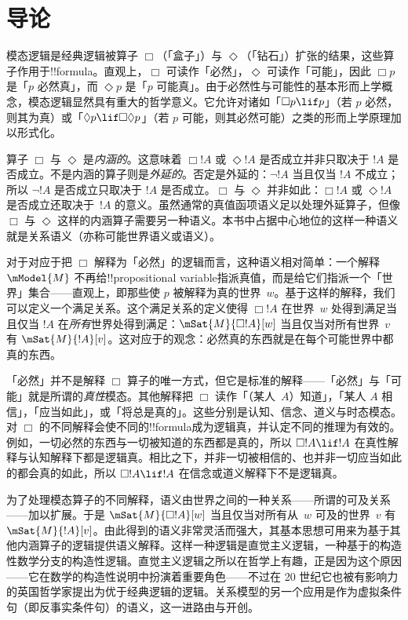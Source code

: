 
\ifdefined\ollangid
\chapter{导论}

模态逻辑是经典逻辑被算子 $\Box$（「盒子」）与 $\Diamond$（「钻石」）扩张的结果，这些算子作用于!!{formula}。直观上，$\Box$ 可读作「必然」，$\Diamond$ 可读作「可能」，因此 $\Box p$ 是「$p$ 必然真」，而 $\Diamond p$ 是「$p$ 可能真」。由于必然性与可能性的基本形而上学概念，模态逻辑显然具有重大的哲学意义。它允许对诸如「$\Box p \lif p$」（若 $p$ 必然，则其为真）或「$\Diamond p \lif \Box\Diamond p$」（若 $p$ 可能，则其必然可能）之类的形而上学原理加以形式化。

算子 $\Box$ 与 $\Diamond$ 是\emph{内涵的}。这意味着 $\Box !A$ 或 $\Diamond !A$ 是否成立并非只取决于 $!A$ 是否成立。不是内涵的算子则是\emph{外延的}。否定是外延的：$\lnot !A$ 当且仅当 $!A$ 不成立；所以 $\lnot !A$ 是否成立只取决于 $!A$ 是否成立。$\Box$ 与 $\Diamond$ 并非如此：$\Box !A$ 或 $\Diamond !A$ 是否成立还取决于~$!A$ 的意义。虽然通常的真值函项语义足以处理外延算子，但像 $\Box$ 与 $\Diamond$ 这样的内涵算子需要另一种语义。本书中占据中心地位的这样一种语义就是关系语义（亦称可能世界语义或语义）。

对于对应于把 $\Box$ 解释为「必然」的逻辑而言，这种语义相对简单：一个解释~$\mModel{M}$ 不再给!!{propositional variable}指派真值，而是给它们指派一个「世界」集合——直观上，即那些使 $p$ 被解释为真的世界~$w$。基于这样的解释，我们可以定义一个满足关系。这个满足关系的定义使得 $\Box !A$ 在世界~$w$ 处得到满足当且仅当 $!A$ 在\emph{所有}世界处得到满足：$\mSat{M}{\Box !A}[w]$ 当且仅当对所有世界~$v$ 有 $\mSat{M}{!A}[v]$。这对应于的观念：必然真的东西就是在每个可能世界中都真的东西。

「必然」并不是解释 $\Box$ 算子的唯一方式，但它是标准的解释——「必然」与「可能」就是所谓的\emph{真性}模态。其他解释把 $\Box$ 读作「（某人~$A$）知道」，「某人 $A$ 相信」，「应当如此」，或「将总是真的」。这些分别是认知、信念、道义与时态模态。对 $\Box$ 的不同解释会使不同的!!{formula}成为逻辑真，并认定不同的推理为有效的。例如，一切必然的东西与一切被知道的东西都是真的，所以 $\Box !A \lif !A$ 在真性解释与认知解释下都是逻辑真。相比之下，并非一切被相信的、也并非一切应当如此的都会真的如此，所以 $\Box !A \lif !A$ 在信念或道义解释下不是逻辑真。

为了处理模态算子的不同解释，语义由世界之间的一种关系——所谓的可及关系——加以扩展。于是 $\mSat{M}{\Box !A}[w]$ 当且仅当对所有从~$w$ 可及的世界~$v$ 有 $\mSat{M}{!A}[v]$。由此得到的语义非常灵活而强大，其基本思想可用来为基于其他内涵算子的逻辑提供语义解释。这样一种逻辑是直觉主义逻辑，一种基于的构造性数学分支的构造性逻辑。直觉主义逻辑之所以在哲学上有趣，正是因为这个原因——它在数学的构造性说明中扮演着重要角色——不过在 20 世纪它也被有影响力的英国哲学家提出为优于经典逻辑的逻辑。关系模型的另一个应用是作为虚拟条件句（即反事实条件句）的语义，这一进路由与开创。

